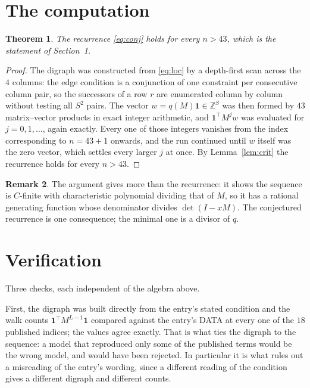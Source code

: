 \documentclass[11pt,a4paper]{article}
\theoremstyle{plain}
\newtheorem{theorem}{Theorem}
\theoremstyle{definition}
\newtheorem{remark}[theorem]{Remark}
\begin{document}
\section{The computation}

\begin{theorem}
The recurrence \eqref{eq:conj} holds for every $n>43$, which is the statement of
Section~1.
\end{theorem}

\begin{proof}
The digraph was constructed from \eqref{eq:loc} by a depth-first scan across the $4$
columns: the edge condition is a conjunction of one constraint per consecutive column
pair, so the successors of a row $r$ are enumerated column by column without testing all
$S^2$ pairs. The vector $w=q(M)\mathbf{1}\in\mathbb{Z}^{S}$ was then formed by $43$
matrix--vector products in exact integer arithmetic, and $\mathbf{1}^{\!\top}M^{j}w$ was
evaluated for $j=0,1,\dots$, again exactly. Every one of those integers vanishes from the
index corresponding to $n=43+1$ onwards, and the run continued until $w$ itself was the
zero vector, which settles every larger $j$ at once. By Lemma~\ref{lem:crit} the recurrence
holds for every $n>43$.
\end{proof}

\begin{remark}
The argument gives more than the recurrence: it shows the sequence is $C$-finite with
characteristic polynomial dividing that of $M$, so it has a rational generating function
whose denominator divides $\det(I-xM)$. The conjectured recurrence is one consequence; the
minimal one is a divisor of $q$.
\end{remark}

\section{Verification}

Three checks, each independent of the algebra above.

First, the digraph was built directly from the entry's stated condition and the walk counts
$\mathbf{1}^{\!\top}M^{L-1}\mathbf{1}$ compared against the entry's DATA at
every one of the $18$ published indices; the values agree exactly. That is what ties
the digraph to the sequence: a model that reproduced only some of the published terms would
be the wrong model, and would have been rejected. In particular it is what rules out a
misreading of the entry's wording, since a different reading of the condition gives a
different digraph and different counts.
\end{document}
